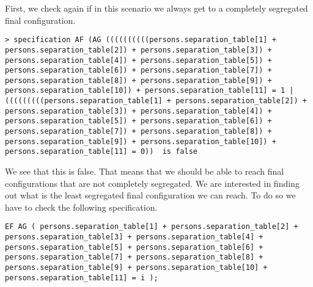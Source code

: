 \documentclass[../main.tex]{subfiles}
\begin{document}
First, we check again if in this scenario we always get to a completely segregated final configuration.
\begin{lstlisting}
> specification AF (AG ((((((((((persons.separation_table[1] + persons.separation_table[2]) + persons.separation_table[3]) + persons.separation_table[4]) + persons.separation_table[5]) + persons.separation_table[6]) + persons.separation_table[7]) + persons.separation_table[8]) + persons.separation_table[9]) + persons.separation_table[10]) + persons.separation_table[11] = 1 | (((((((((persons.separation_table[1] + persons.separation_table[2]) + persons.separation_table[3]) + persons.separation_table[4]) + persons.separation_table[5]) + persons.separation_table[6]) + persons.separation_table[7]) + persons.separation_table[8]) + persons.separation_table[9]) + persons.separation_table[10]) + persons.separation_table[11] = 0))  is false
\end{lstlisting}

We see that this is false. That means that we should be able to reach final configurations that are not completely segregated. We are interested in finding out what is the least segregated final configuration we can reach. To do so we have to check the following specification.

\begin{lstlisting}
EF AG ( persons.separation_table[1] + persons.separation_table[2] + persons.separation_table[3] + persons.separation_table[4] + persons.separation_table[5] + persons.separation_table[6] + persons.separation_table[7] + persons.separation_table[8] + persons.separation_table[9] + persons.separation_table[10] + persons.separation_table[11] = i );
\end{lstlisting}
\end{document}
